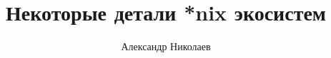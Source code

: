 \documentclass[a4paper, 14 pt, final]{extarticle}
\begin{document}
%
\title{Некоторые детали *nix экосистем}

\author{Александр Николаев}

\maketitle

\newpage
{}
\setcounter{tocdepth}{5}
\setcounter{secnumdepth}{5}
\tableofcontents
\newpage
















\appendix










\end{document}
